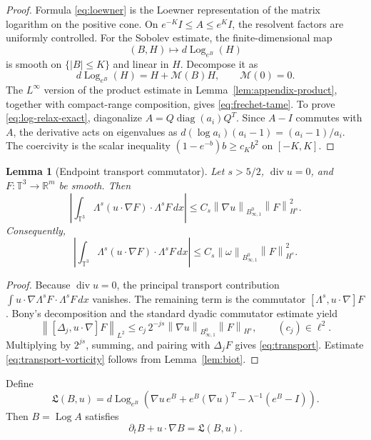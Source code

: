 \documentclass[11pt]{article}
\numberwithin{equation}{section}
\newtheorem{lemma}[theorem]{Lemma}
\newcommand{\T}{\mathbb T}
\newcommand{\R}{\mathbb R}
\newcommand{\Id}{I}
\newcommand{\divv}{\operatorname{div}}
\newcommand{\Log}{\operatorname{Log}}
\newcommand{\Besov}{B^0_{\infty,1}}
\newcommand{\norm}[1]{\left\lVert #1\right\rVert}
\begin{document}
\begin{proof}
Formula \eqref{eq:loewner} is the Loewner representation of the matrix
logarithm on the positive cone.  On \(e^{-K}\Id\le A\le e^K\Id\), the
resolvent factors are uniformly controlled.  For the Sobolev estimate, the
finite-dimensional map
\[
  (B,H)\mapsto d\Log_{e^B}(H)
\]
is smooth on \(\{|B|\le K\}\) and linear in \(H\).  Decompose it as
\[
  d\Log_{e^B}(H)=H+\mathcal M(B)H,\qquad \mathcal M(0)=0 .
\]
The \(L^\infty\) version of the product estimate in
Lemma~\ref{lem:appendix-product}, together with compact-range composition,
gives \eqref{eq:frechet-tame}.  To prove \eqref{eq:log-relax-exact},
diagonalize
\(A=Q\operatorname{diag}(a_i)Q^T\).  Since \(A-\Id\) commutes with \(A\), the
derivative acts on eigenvalues as \(d(\log a_i)(a_i-1)=(a_i-1)/a_i\).
The coercivity is the scalar inequality
\((1-e^{-b})b\ge c_K b^2\) on \([-K,K]\).
\end{proof}

\begin{lemma}[Endpoint transport commutator]
\label{lem:transport}
Let \(s>5/2\), \(\divv u=0\), and \(F:\T^3\to\R^m\) be smooth.  Then
\begin{equation}
  \left|
  \int_{\T^3}\Lambda^s(u\cdot\nabla F)\cdot\Lambda^sF\,dx
  \right|
  \le
  C_s\norm{\nabla u}_{B^0_{\infty,1}}\norm{F}_{H^s}^2 .
  \label{eq:transport}
\end{equation}
Consequently,
\begin{equation}
  \left|
  \int_{\T^3}\Lambda^s(u\cdot\nabla F)\cdot\Lambda^sF\,dx
  \right|
  \le
  C_s\norm{\omega}_{\Besov}\norm{F}_{H^s}^2 .
  \label{eq:transport-vorticity}
\end{equation}
\end{lemma}

\begin{proof}
Because \(\divv u=0\), the principal transport contribution
\(\int u\cdot\nabla\Lambda^sF\cdot\Lambda^sF\,dx\) vanishes.  The remaining
term is the commutator \([\Lambda^s,u\cdot\nabla]F\).  Bony's decomposition
and the standard dyadic commutator estimate yield
\[
  \norm{[\Delta_j,u\cdot\nabla]F}_{L^2}
  \le
  c_j\,2^{-js}
  \norm{\nabla u}_{B^0_{\infty,1}}\norm{F}_{H^s},
  \qquad (c_j)\in\ell^2 .
\]
Multiplying by \(2^{js}\), summing, and pairing with \(\Delta_jF\) gives
\eqref{eq:transport}.  Estimate \eqref{eq:transport-vorticity} follows from
Lemma~\ref{lem:biot}.
\end{proof}

Define
\[
  \mathfrak L(B,u)=
  d\Log_{e^B}\left(\nabla u\,e^B+e^B(\nabla u)^T-\lambda^{-1}(e^B-\Id)\right).
\]
Then \(B=\Log A\) satisfies
\[
  \partial_tB+u\cdot\nabla B=\mathfrak L(B,u).
\]
\end{document}
